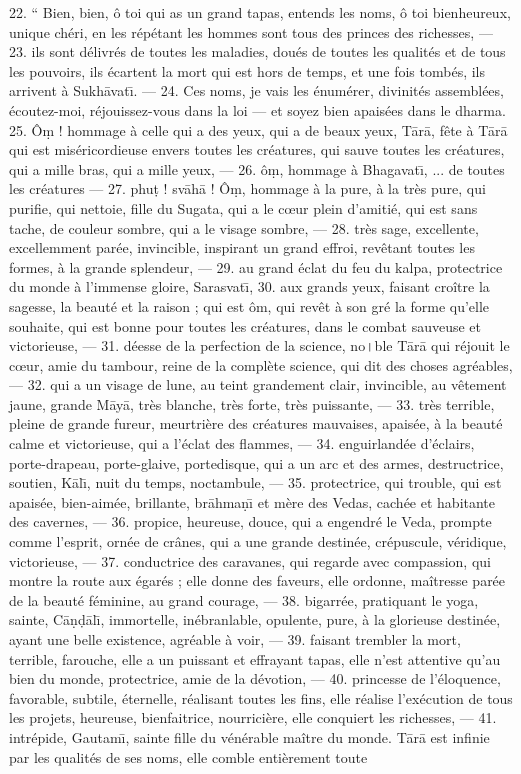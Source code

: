 \documentclass[a4paper, 11pt, oneside, french]{article}
\begin{document}
22. `` Bien, bien, ô toi qui as un grand tapas, entends les noms, ô toi bienheureux, unique chéri, en les répétant les hommes sont tous des princes des richesses, --- 23. ils sont délivrés de toutes les maladies, doués de toutes les qualités et de tous les pouvoirs, ils écartent la mort qui est hors de temps, et une fois tombés, ils arrivent à Sukh\={a}vat\={\i}. --- 24. Ces noms, je vais les énumérer, divinités assemblées, écoutez-moi, réjouissez-vous dans la loi --- et soyez bien apaisées dans le dharma. 25. Ô\d{m} ! hommage à celle qui a des yeux, qui a de beaux yeux, T\={a}r\={a}, fête à T\={a}r\={a} qui est miséricordieuse envers toutes les créatures, qui sauve toutes les créatures, qui a mille bras, qui a mille yeux, --- 26. ô\d{m}, hommage à Bhagavat\={\i}, ... de toutes les créatures --- 27. phu\d{t} ! sv\={a}h\={a} ! Ô\d{m}, hommage à la pure, à la très pure, qui purifie, qui nettoie, fille du Sugata, qui a le cœur plein d'amitié, qui est sans tache, de couleur sombre, qui a le visage sombre, --- 28. très sage, excellente, excellemment parée, invincible, inspirant un grand effroi, revêtant toutes les formes, à la grande splendeur, --- 29. au grand éclat du feu du kalpa, protectrice du monde à l'immense gloire, Sarasvat\={\i}, 30. aux grands yeux, faisant croître la sagesse, la beauté et la raison ; qui est ôm, qui revêt à son gré la forme qu'elle souhaite, qui est bonne pour toutes les créatures, dans le combat sauveuse et victorieuse, --- 31. déesse de la perfection de la science, no।ble T\={a}r\={a} qui réjouit le cœur, amie du tambour, reine de la complète science, qui dit des choses agréables,--- 32. qui a un visage de lune, au teint grandement clair, invincible, au vêtement jaune, grande M\={a}y\={a}, très blanche, très forte, très puissante, --- 33. très terrible, pleine de grande fureur, meurtrière des créatures mauvaises, apaisée, à la beauté calme et victorieuse, qui a l'éclat des flammes, --- 34. enguirlandée d'éclairs, porte-drapeau, porte-glaive, portedisque, qui a un arc et des armes, destructrice, soutien, K\={a}l\={\i}, nuit du temps, noctambule, --- 35. protectrice, qui trouble, qui est apaisée, bien-aimée, brillante, br\={a}hma\d{n}\={\i} et mère des Vedas, cachée et habitante des cavernes, --- 36. propice, heureuse, douce, qui a engendré le Veda, prompte comme l'esprit, ornée de crânes, qui a une grande destinée, crépuscule, véridique, victorieuse, --- 37. conductrice des caravanes, qui regarde avec compassion, qui montre la route aux égarés ; elle donne des faveurs, elle ordonne, maîtresse parée de la beauté féminine, au grand courage, --- 38. bigarrée, pratiquant le yoga, sainte, C\={a}\d{n}\d{d}\={a}l\={\i}, immortelle, inébranlable, opulente, pure, à la glorieuse destinée, ayant une belle existence, agréable à voir, --- 39. faisant trembler la mort, terrible, farouche, elle a un puissant et effrayant tapas, elle n'est attentive qu'au bien du monde, protectrice, amie de la dévotion, --- 40. princesse de l'éloquence, favorable, subtile, éternelle, réalisant toutes les fins, elle réalise l'exécution de tous les projets, heureuse, bienfaitrice, nourricière, elle conquiert les richesses, --- 41. intrépide, Gautam\={\i}, sainte fille du vénérable maître du monde. T\={a}r\={a} est infinie par les qualités de ses noms, elle comble entièrement toute 
\end{document}
